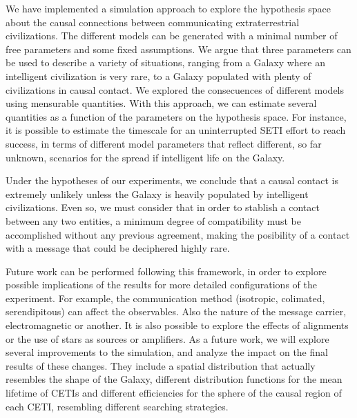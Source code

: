 \documentclass[crop]{CSLB}%
\begin{document}
We have implemented a simulation approach to explore the hypothesis
space about the causal connections between communicating
extraterrestrial civilizations.
%
The different models can be generated with a minimal number of free
parameters and some fixed assumptions.
%
We argue that three parameters can be used to describe a variety of
situations, ranging from a Galaxy where an intelligent civilization is
very rare, to a Galaxy populated with plenty of civilizations in
causal contact.
%
We explored the consecuences of different models using mensurable
quantities.
%
With this approach, we can estimate several quantities as a function
of the parameters on the hypothesis space.
%
For instance, it is possible to estimate the timescale for an
uninterrupted SETI effort to reach success, in terms of different
model parameters that reflect different, so far unknown, scenarios
for the spread if intelligent life on the Galaxy.


Under the hypotheses of our experiments, we conclude that
a causal contact is extremely unlikely unless the Galaxy is heavily
populated by intelligent civilizations.
%
Even so, we must consider that in order to stablish a contact between
any two entities, a minimum degree of compatibility must be
accomplished without any previous agreement, 
making the posibility of a contact with a message that
could be deciphered highly rare.


Future work can be performed following this framework, in order to
explore possible implications of the results for more detailed 
configurations of the experiment.
%
For example, the communication method (isotropic, colimated,
serendipitous) can affect the observables.
%
Also the nature of the message carrier, electromagnetic or another.
%
It is also possible to explore the effects of alignments or the use of
stars as sources or amplifiers.
%
%
As a future work, we will explore several improvements to the
simulation, and analyze the impact on the final results of these
changes.
%
They include a spatial distribution that actually resembles the shape
of the Galaxy, different distribution functions for the mean lifetime
of CETIs and different efficiencies for the sphere of the causal
region of each CETI, resembling different searching strategies.
 
\end{document}
